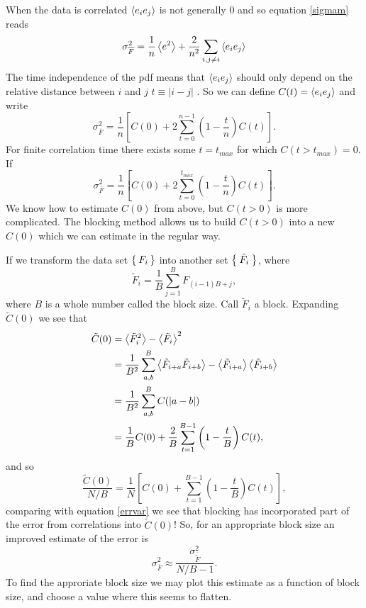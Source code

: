 \documentclass[a4paper,English,10pt]{article}
\newcommand{\be}{\begin{equation}}
\newcommand{\ee}{\end{equation}}
\newcommand{\f}{\frac}
\renewcommand{\bar}{\overline}
\renewcommand{\braket}{\Braket}
\begin{document}
When the data is correlated $\braket{e_ie_j}$ is not generally $0$ and so equation \ref{sigmam} reads
\be
\sigma_{\bar{F}}^2 = \f{1}{n}\braket{e^2} + \f{2}{n^2}\sum_{i,j\neq i}\braket{e_ie_j}
\ee
The time independence of the pdf means that $\braket{e_ie_j}$ should only depend on the relative distance between $i$ and $j$
$t \equiv |i-j|$ \cite{block}. So we can define $C(t) = \braket{e_ie_j}$ and write
\be
\sigma_{\bar{F}}^2 = \f{1}{n}\left[C(0) + 2\sum_{t = 0}^{n-1}\left(1-\f{t}{n}\right)C(t)\right]. 
\ee
For finite correlation time there exists some $t = t_{max}$ for which $C(t>t_{max}) = 0$. If
\be
\sigma_{\bar{F}}^2 = \f{1}{n}\left[C(0) + 2\sum_{t = 0}^{t_{max}}\left(1-\f{t}{n}\right)C(t)\right]. \label{errvar}
\ee
We know how to estimate $C(0)$ from above, but $C(t>0)$ is more complicated.
The blocking method allows us to build $C(t>0)$ into a new $C(0)$ which we can estimate in the regular way.


If we transform the data set $\Set{F_i}$ into another set $\Set{\tilde{F}_i}$, where
\be
\tilde{F}_i = \f{1}{B}\sum_{j=1}^{B}F_{(i-1)B+j},\label{block}
\ee
where $B$ is a whole number called the block size. Call $\tilde{F}_i$ a block.
Expanding $\tilde{C}(0)$ we see that
\begin{align*}
  \tilde{C}(0) &= \braket{\tilde{F}_i^2}-\braket{\tilde{F}_i}^2\\
  &= \f{1}{B^2}\sum_{a,b}^B\braket{\tilde{F}_{i+a}\tilde{F}_{i+b}}-\braket{\tilde{F}_{i+a}}\braket{\tilde{F}_{i+b}}\\
  &= \f{1}{B^2}\sum_{a,b}^BC(|a-b|)\\
  &= \f{1}{B}C(0) + \f{2}{B}\sum_{t=1}^{B-1}\left(1-\f{t}{B}\right)C(t),
\end{align*}
and so
\be
\f{\tilde{C}(0)}{N/B} = \f{1}{N}\left[C(0) +\sum_{t = 1}^{B-1}\left(1-\f{t}{B}\right)C(t)\right],\label{blockvar}
\ee
comparing with equation \ref{errvar} we see that blocking has incorporated part of the error from correlations into $\tilde{C}(0)$! So, for an appropriate block size an improved estimate of the error is
\be
\sigma_{\bar{F}}^2 \approx \f{\sigma_{\bar{\tilde{F}}}^2}{N/B -1}.\label{errest}
\ee
To find the approriate block size we may plot this estimate as a function of block size, and choose a value where this seems to flatten. 
\end{document}
